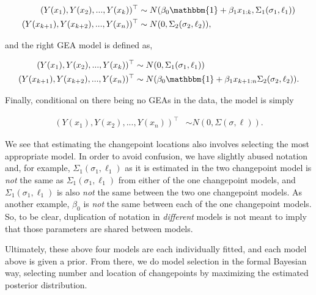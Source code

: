 \documentclass[12pt]{article}
\begin{document}
\begin{align}
(Y(x_1), Y(x_2), ..., Y(x_{k}))^{\top} &\sim N(\beta_{0}\mathbbm{1} + \beta_{1} x_{1:k}, \Sigma_1(\sigma_1, \ell_1)) \\
(Y(x_{k + 1}), Y(x_{k + 2}), ..., Y(x_{n}))^{\top} &\sim N(0, \Sigma_2(\sigma_2, \ell_2)),
\end{align}

\noindent and the right GEA model is defined as,

\begin{align}
(Y(x_{1}), Y(x_{2}), ..., Y(x_{k}))^{\top} &\sim N(0, \Sigma_1(\sigma_1, \ell_1)) \\ 
(Y(x_{k + 1}), Y(x_{k + 2}), ..., Y(x_n))^{\top} &\sim N(\beta_{0}\mathbbm{1} + \beta_{1} x_{k + 1:n} \Sigma_2(\sigma_2, \ell_2)).
\end{align}

\noindent Finally, conditional on there being no GEAs in the data, the
model is simply

\begin{align}
(Y(x_{1}), Y(x_{2}), ..., Y(x_{n}))^{\top} &\sim N(0, \Sigma(\sigma, \ell)).
\end{align}

We see that estimating the changepoint locations also involves selecting
the most appropriate model. In order to avoid confusion, we have
slightly abused notation and, for example,
\(\Sigma_1(\sigma_1, \ell_1)\) as it is estimated in the two changepoint
model is \emph{not} the same as \(\Sigma_1(\sigma_1, \ell_1)\) from
either of the one changepoint models, and \(\Sigma_1(\sigma_1, \ell_1)\)
is also \emph{not} the same between the two one changepoint models. As
another example, \(\beta_0\) is \emph{not} the same between each of the
one changepoint models. So, to be clear, duplication of notation in
\emph{different} models is not meant to imply that those parameters are
shared between models.

Ultimately, these above four models are each individually fitted, and
each model above is given a prior. From there, we do model selection in
the formal Bayesian way, selecting number and location of changepoints
by maximizing the estimated posterior distribution.
\end{document}
